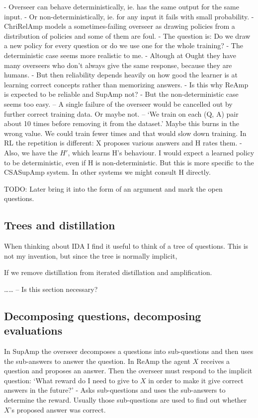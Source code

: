 \documentclass{farlamp}
\begin{document}
- Overseer can behave deterministically, ie. has the same output for the same
input.
- Or non-deterministically, ie. for any input it fails with small probability.
- ChriRelAmp models a sometimes-failing overseer as drawing policies from a
distribution of policies and some of them are foul.
- The question is: Do we draw a new policy for every question or do we use one
for the whole training?
- The deterministic case seems more realistic to me.
    - Altough at Ought they have many overseers who don't always give the same
    response, because they are humans.
- But then reliability depends heavily on how good the learner is at learning
correct concepts rather than memorizing answers.
- Is this why ReAmp is expected to be reliable and SupAmp not?
- But the non-deterministic case seems too easy. – A single failure of the
overseer would be cancelled out by further correct training data. Or maybe not.
– ‘We train on each (Q, A) pair about 10 times before removing it from the
dataset.’ \parencite[footnote 3]{CSASupAmp} Maybe this burns in the wrong value.
We could train fewer times and that would slow down training. In RL the
repetition is different: X proposes various answers and H rates them.
- Also, we have the $H'$, which learns H's behaviour. I would expect a learned
policy to be deterministic, even if H is non-deterministic. But this is more
specific to the CSASupAmp system. In other systems we might consult H directly.

TODO: Later bring it into the form of an argument and mark the open questions.


\subsection{Trees and distillation}

When thinking about IDA I find it useful to think of a tree of questions. This
is not my invention, but since the tree is normally implicit,

If we remove distillation from iterated distillation and amplification.

…… – Is this section necessary?


\subsection{Decomposing questions, decomposing evaluations}

In SupAmp the overseer decomposes a questions into sub-questions and then uses
the sub-answers to answer the question. In ReAmp the agent $X$ receives a
question and proposes an answer. Then the overseer must respond to the
implicit question: ‘What reward do I need to give to $X$ in order to make it
give correct answers in the future?’
- Asks sub-questions and uses the sub-answers to determine the reward. Usually
those sub-questions are used to find out whether $X$'s proposed answer was
correct.
\end{document}
